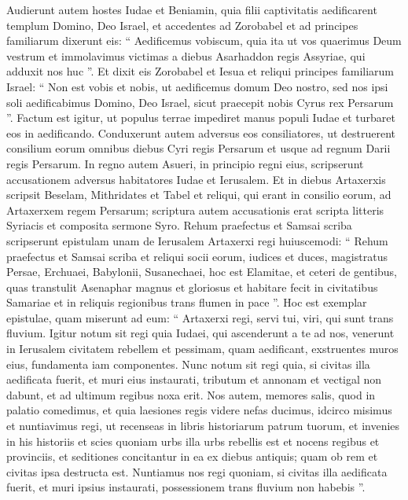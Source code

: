 \begin{biblechapter}
\begin{biblechapter}
\begin{biblechapter}
\begin{biblechapter}
\verse Audierunt autem hostes Iudae et Beniamin, quia filii captivitatis aedificarent templum Domino, Deo Israel, 
\verse et accedentes ad Zorobabel et ad principes familiarum dixerunt eis: “ Aedificemus vobiscum, quia ita ut vos quaerimus Deum vestrum et immolavimus victimas a diebus Asarhaddon regis Assyriae, qui adduxit nos huc ”. 
\verse Et dixit eis Zorobabel et Iesua et reliqui principes familiarum Israel: “ Non est vobis et nobis, ut aedificemus domum Deo nostro, sed nos ipsi soli aedificabimus Domino, Deo Israel, sicut praecepit nobis Cyrus rex Persarum ”. 
\verse Factum est igitur, ut populus terrae impediret manus populi Iudae et turbaret eos in aedificando. 
\verse Conduxerunt autem adversus eos consiliatores, ut destruerent consilium eorum omnibus diebus Cyri regis Persarum et usque ad regnum Darii regis Persarum.
 \verse In regno autem Asueri, in principio regni eius, scripserunt accusationem adversus habitatores Iudae et Ierusalem. 
\verse Et in diebus Artaxerxis scripsit Beselam, Mithridates et Tabel et reliqui, qui erant in consilio eorum, ad Artaxerxem regem Persarum; scriptura autem accusationis erat scripta litteris Syriacis et composita sermone Syro. 
\verse Rehum praefectus et Samsai scriba scripserunt epistulam unam de Ierusalem Artaxerxi regi huiuscemodi: 
\verse “ Rehum praefectus et Samsai scriba et reliqui socii eorum, iudices et duces, magistratus Persae, Erchuaei, Babylonii, Susanechaei, hoc est Elamitae, 
\verse et ceteri de gentibus, quas transtulit Asenaphar magnus et gloriosus et habitare fecit in civitatibus Samariae et in reliquis regionibus trans flumen in pace ”.
 \verse Hoc est exemplar epistulae, quam miserunt ad eum:
 “ Artaxerxi regi, servi tui, viri, qui sunt trans fluvium. Igitur 
\verse notum sit regi quia Iudaei, qui ascenderunt a te ad nos, venerunt in Ierusalem civitatem rebellem et pessimam, quam aedificant, exstruentes muros eius, fundamenta iam componentes. 
\verse Nunc notum sit regi quia, si civitas illa aedificata fuerit, et muri eius instaurati, tributum et annonam et vectigal non dabunt, et ad ultimum regibus noxa erit. 
\verse Nos autem, memores salis, quod in palatio comedimus, et quia laesiones regis videre nefas ducimus, idcirco misimus et nuntiavimus regi, 
\verse ut recenseas in libris historiarum patrum tuorum, et invenies in his historiis et scies quoniam urbs illa urbs rebellis est et nocens regibus et provinciis, et seditiones concitantur in ea ex diebus antiquis; quam ob rem et civitas ipsa destructa est. 
\verse Nuntiamus nos regi quoniam, si civitas illa aedificata fuerit, et muri ipsius instaurati, possessionem trans fluvium non habebis ”.

\end{biblechapter}
\end{biblechapter}
\end{biblechapter}
\end{biblechapter}
